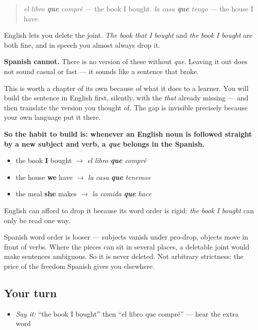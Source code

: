 \begin{grammarlens}[title={Grammar Lens: English drops it, Spanish never does}]
\begin{quote}
\emph{el libro \textbf{que} compré} — the book I bought. \emph{la casa \textbf{que} tengo} — the house I have.
\end{quote}

English lets you delete the joint. \emph{The book that I bought} and \emph{the book I bought} are both fine, and in speech you almost always drop it.

\textbf{Spanish cannot.} There is no version of these without \emph{que}. Leaving it out does not sound casual or fast — it sounds like a sentence that broke.

This is worth a chapter of its own because of what it does to a learner. You will build the sentence in English first, silently, with the \emph{that} already missing — and then translate the version you thought of. The gap is invisible precisely because your own language put it there.

\textbf{So the habit to build is: whenever an English noun is followed straight by a new subject and verb, a \emph{que} belongs in the Spanish.}

\begin{itemize}
\raggedright
  \item the book \textbf{I} bought $\to$ \emph{el libro \textbf{que} compré}
  \item the house \textbf{we} have $\to$ \emph{la casa \textbf{que} tenemos}
  \item the meal \textbf{she} makes $\to$ \emph{la comida \textbf{que} hace}
\end{itemize}
\end{grammarlens}

\begin{culture}
English can afford to drop it because its word order is rigid: \emph{the book I bought} can only be read one way.

Spanish word order is looser — subjects vanish under pro-drop, objects move in front of verbs. Where the pieces can sit in several places, a deletable joint would make sentences ambiguous. So it is never deleted. Not arbitrary strictness: the price of the freedom Spanish gives you elsewhere.
\end{culture}

\subsection*{Your turn}
\begin{itemize}
\raggedright
  \item \emph{Say it:} \textquotedblleft{}the book I bought\textquotedblright{} then \textquotedblleft{}el libro que compré\textquotedblright{} — hear the extra word
\end{itemize}

